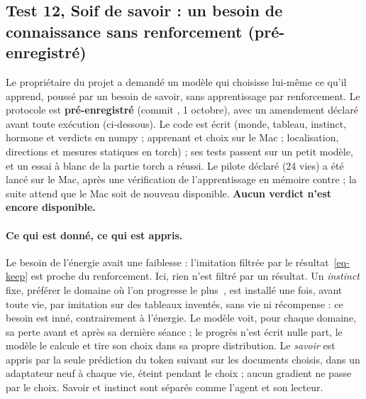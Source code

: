 \documentclass[11pt,a4paper]{article}
\newcommand{\code}[1]{\texttt{\detokenize{#1}}}
\begin{document}
\subsection{Test 12, \og Soif de savoir \fg{} : un besoin de connaissance sans renforcement (pré-enregistré)}
\label{sec-soif}

Le propriétaire du projet a demandé un modèle qui choisisse lui-même ce qu'il
apprend, poussé par un besoin de savoir, sans apprentissage par renforcement. Le
protocole est \textbf{pré-enregistré} (commit \code{017f2e5}, 1\ier{} octobre), avec un
amendement déclaré avant toute exécution (ci-dessous). Le code est écrit (monde,
tableau, instinct, hormone et verdicts en numpy ; apprenant et choix sur le Mac ;
localisation, directions et mesures statiques en torch) ; ses tests passent sur un
petit modèle, et un essai à blanc de la partie torch a réussi. Le pilote déclaré
(24 vies) a été lancé sur le Mac, après une vérification de l'apprentissage en mémoire
contre \code{mlx_lm.lora} ; la suite attend que le Mac soit de nouveau disponible.
\textbf{Aucun verdict n'est encore disponible.}

\paragraph{Ce qui est donné, ce qui est appris.} Le besoin de l'énergie avait une
faiblesse : l'imitation filtrée par le résultat~\eqref{eq-keep} est proche du
renforcement. Ici, rien n'est filtré par un résultat. Un \emph{instinct} fixe,
préférer le domaine où l'on progresse le plus~\cite{oudeyer2007,oudeyer2007ieee},
est installé une fois, avant toute vie, par imitation sur des tableaux inventés,
sans vie ni récompense : ce besoin est inné, contrairement à l'énergie. Le modèle
voit, pour chaque domaine, sa perte avant et après sa dernière séance ; le progrès
n'est écrit nulle part, le modèle le calcule et tire son choix dans sa propre
distribution. Le \emph{savoir} est appris par la seule prédiction du token suivant
sur les documents choisis, dans un adaptateur neuf à chaque vie, éteint pendant le
choix ; aucun gradient ne passe par le choix. Savoir et instinct sont séparés comme
l'agent et son lecteur.
\end{document}
